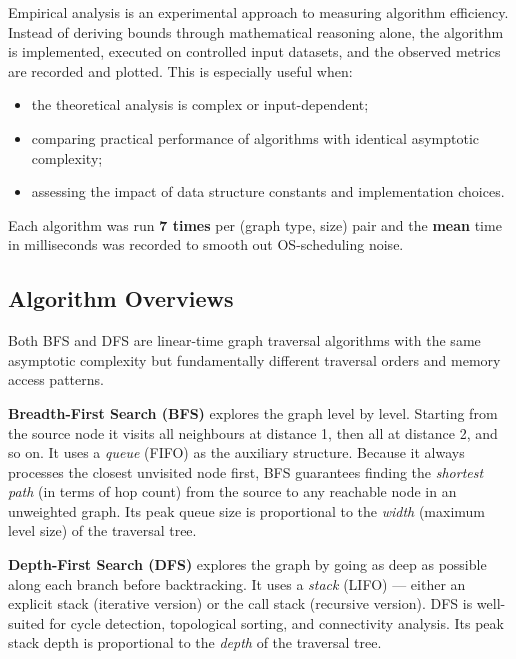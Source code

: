 \documentclass[12pt]{article}
\begin{document}
\hspace{0.8cm} Empirical analysis is an experimental approach to measuring algorithm
efficiency. Instead of deriving bounds through mathematical reasoning alone, the
algorithm is implemented, executed on controlled input datasets, and the observed
metrics are recorded and plotted. This is especially useful when:

\begin{itemize}
  \item the theoretical analysis is complex or input-dependent;
  \item comparing practical performance of algorithms with identical asymptotic complexity;
  \item assessing the impact of data structure constants and implementation choices.
\end{itemize}

Each algorithm was run \textbf{7 times} per (graph type, size) pair and the
\textbf{mean} time in milliseconds was recorded to smooth out OS-scheduling noise.

\subsection*{Algorithm Overviews}

\hspace{0.8cm} Both BFS and DFS are linear-time graph traversal algorithms with the
same asymptotic complexity but fundamentally different traversal orders and memory
access patterns.

\textbf{Breadth-First Search (BFS)} explores the graph level by level.  Starting
from the source node it visits all neighbours at distance 1, then all at distance 2,
and so on.  It uses a \textit{queue} (FIFO) as the auxiliary structure.  Because it
always processes the closest unvisited node first, BFS guarantees finding the
\emph{shortest path} (in terms of hop count) from the source to any reachable node in
an unweighted graph.  Its peak queue size is proportional to the \emph{width} (maximum
level size) of the traversal tree.

\textbf{Depth-First Search (DFS)} explores the graph by going as deep as possible
along each branch before backtracking.  It uses a \textit{stack} (LIFO) --- either an
explicit stack (iterative version) or the call stack (recursive version).  DFS is
well-suited for cycle detection, topological sorting, and connectivity analysis.  Its
peak stack depth is proportional to the \emph{depth} of the traversal tree.
\end{document}
